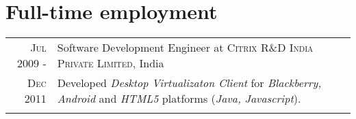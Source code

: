 \documentclass[a4paper,10pt]{article}
\begin{document}

\section {Full-time employment}
\begin{tabular}{r|l}

  \textsc{Jul 2009 -} & Software Development Engineer at
                \textsc{Citrix R\&D India Private Limited}, India \\
  \textsc {Dec 2011}       &\footnotesize{Developed   \emph{Desktop Virtualizaton
                 Client}  for
                   \emph{Blackberry, Android}  and \emph{HTML5} platforms
                   (\emph{Java, Javascript}).
                   }\\\multicolumn{2}{c}{} \\  
\end{tabular}
\end{document}
